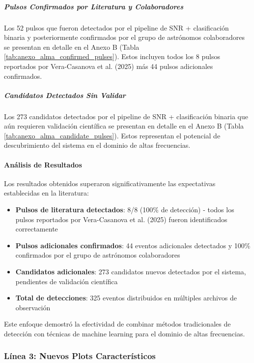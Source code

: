 \subparagraph{Pulsos Confirmados por Literatura y Colaboradores}

Los 52 pulsos que fueron detectados por el pipeline de SNR + clasificación binaria y posteriormente confirmados por el grupo de astrónomos colaboradores se presentan en detalle en el Anexo B (Tabla \ref{tab:anexo_alma_confirmed_pulses}). Estos incluyen todos los 8 pulsos reportados por Vera-Casanova et al. (2025) más 44 pulsos adicionales confirmados.

\subparagraph{Candidatos Detectados Sin Validar}

Los 273 candidatos detectados por el pipeline de SNR + clasificación binaria que aún requieren validación científica se presentan en detalle en el Anexo B (Tabla \ref{tab:anexo_alma_candidate_pulses}). Estos representan el potencial de descubrimiento del sistema en el dominio de altas frecuencias.

\paragraph{Análisis de Resultados}

Los resultados obtenidos superaron significativamente las expectativas establecidas en la literatura:

\begin{itemize}
    \item \textbf{Pulsos de literatura detectados}: 8/8 (100\% de detección) - todos los pulsos reportados por Vera-Casanova et al. (2025) fueron identificados correctamente
    \item \textbf{Pulsos adicionales confirmados}: 44 eventos adicionales detectados y 100\% confirmados por el grupo de astrónomos colaboradores
    \item \textbf{Candidatos adicionales}: 273 candidatos nuevos detectados por el sistema, pendientes de validación científica
    \item \textbf{Total de detecciones}: 325 eventos distribuidos en múltiples archivos de observación
\end{itemize}

Este enfoque demostró la efectividad de combinar métodos tradicionales de detección con técnicas de machine learning para el dominio de altas frecuencias.

\subsubsection{Línea 3: Nuevos Plots Característicos}


